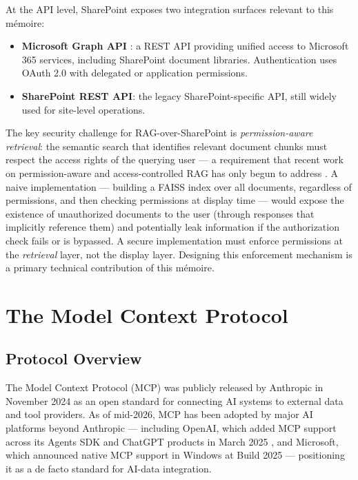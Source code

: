 At the API level, SharePoint exposes two integration surfaces relevant to this mémoire:

\begin{itemize}
  \item \textbf{Microsoft Graph API} \citep{MicrosoftGraph2024}: a REST API providing unified access to Microsoft 365 services, including SharePoint document libraries. Authentication uses OAuth 2.0 with delegated or application permissions.
  \item \textbf{SharePoint REST API}: the legacy SharePoint-specific API, still widely used for site-level operations.
\end{itemize}

The key security challenge for RAG-over-SharePoint is \textit{permission-aware retrieval}: the semantic search that identifies relevant document chunks must respect the access rights of the querying user --- a requirement that recent work on permission-aware and access-controlled RAG has only begun to address \citep{Jeong2025, Chen2025SAC}. A naive implementation — building a FAISS index over all documents, regardless of permissions, and then checking permissions at display time — would expose the existence of unauthorized documents to the user (through responses that implicitly reference them) and potentially leak information if the authorization check fails or is bypassed. A secure implementation must enforce permissions at the \textit{retrieval} layer, not the display layer. Designing this enforcement mechanism is a primary technical contribution of this mémoire.

\section{The Model Context Protocol}
\label{sec:bg-mcp}

\subsection{Protocol Overview}

The Model Context Protocol (MCP) \citep{Anthropic2024MCP} was publicly released by Anthropic in November 2024 as an open standard for connecting AI systems to external data and tool providers. As of mid-2026, MCP has been adopted by major AI platforms beyond Anthropic --- including OpenAI, which added MCP support across its Agents SDK and ChatGPT products in March 2025 \citep{TechCrunch2025MCP}, and Microsoft, which announced native MCP support in Windows at Build 2025 \citep{WindowsCentral2025MCP} --- positioning it as a de facto standard for AI-data integration.

